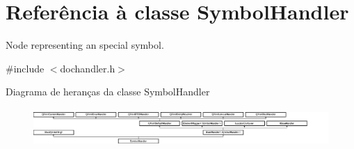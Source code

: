 \hypertarget{class_symbol_handler}{\section{Referência à classe Symbol\-Handler}
\label{class_symbol_handler}
}


Node representing an special symbol.  




{\ttfamily \#include $<$dochandler.\-h$>$}

Diagrama de heranças da classe Symbol\-Handler\begin{figure}[H]
\begin{center}
\leavevmode
\includegraphics[height=1.467890cm]{class_symbol_handler}
\end{center}
\end{figure}
